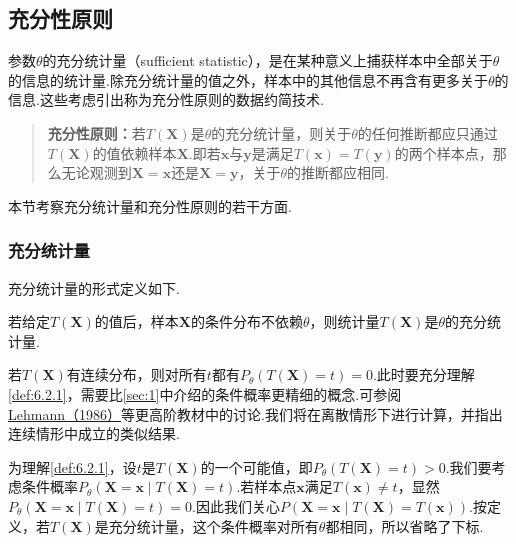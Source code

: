 \subsection{充分性原则}\label{sec:6.2}
参数$\theta$的充分统计量（sufficient statistic），是在某种意义上捕获样本中全部关于$\theta$的信息的统计量.除充分统计量的值之外，样本中的其他信息不再含有更多关于$\theta$的信息.这些考虑引出称为充分性原则的数据约简技术.
\begin{quote}
\textbf{充分性原则：}若$T(\boldsymbol X)$是$\theta$的充分统计量，则关于$\theta$的任何推断都应只通过$T(\boldsymbol X)$的值依赖样本$\boldsymbol X$.即若$\boldsymbol x$与$\boldsymbol y$是满足$T(\boldsymbol x)=T(\boldsymbol y)$的两个样本点，那么无论观测到$\boldsymbol X=\boldsymbol x$还是$\boldsymbol X=\boldsymbol y$，关于$\theta$的推断都应相同.
\end{quote}
本节考察充分统计量和充分性原则的若干方面.
\subsubsection{充分统计量}\label{sec:6.2.1}
充分统计量的形式定义如下.
\begin{definition}\label{def:6.2.1}
若给定$T(\boldsymbol X)$的值后，样本$\boldsymbol X$的条件分布不依赖$\theta$，则统计量$T(\boldsymbol X)$是$\theta$的充分统计量.
\end{definition}
若$T(\boldsymbol X)$有连续分布，则对所有$t$都有$P_\theta(T(\boldsymbol X)=t)=0$.此时要充分理解\autoref{def:6.2.1}，需要比\autoref{sec:1}中介绍的条件概率更精细的概念.可参阅\hyperref[bib:source198]{Lehmann（1986）}等更高阶教材中的讨论.我们将在离散情形下进行计算，并指出连续情形中成立的类似结果.

为理解\autoref{def:6.2.1}，设$t$是$T(\boldsymbol X)$的一个可能值，即$P_\theta(T(\boldsymbol X)=t)>0$.我们要考虑条件概率$P_\theta(\boldsymbol X=\boldsymbol x\mid T(\boldsymbol X)=t)$.若样本点$\boldsymbol x$满足$T(\boldsymbol x)\ne t$，显然$P_\theta(\boldsymbol X=\boldsymbol x\mid T(\boldsymbol X)=t)=0$.因此我们关心$P(\boldsymbol X=\boldsymbol x\mid T(\boldsymbol X)=T(\boldsymbol x))$.按定义，若$T(\boldsymbol X)$是充分统计量，这个条件概率对所有$\theta$都相同，所以省略了下标.

